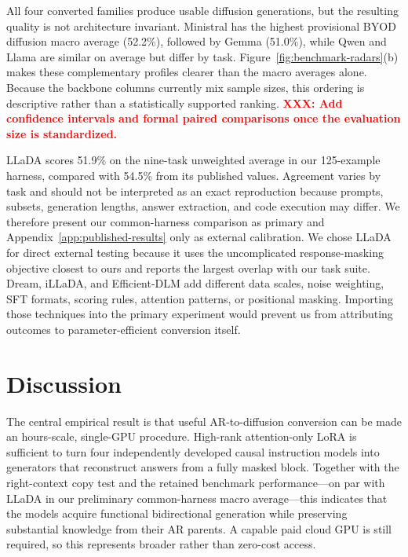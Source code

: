 \documentclass{article}
\newcommand{\xxx}[1]{\textcolor{red}{\textbf{XXX: #1}}}
\begin{document}
All four converted families produce usable diffusion generations, but the resulting quality is not architecture invariant. Ministral has the highest provisional BYOD diffusion macro average (52.2\%), followed by Gemma (51.0\%), while Qwen and Llama are similar on average but differ by task. Figure~\ref{fig:benchmark-radars}(b) makes these complementary profiles clearer than the macro averages alone. Because the backbone columns currently mix sample sizes, this ordering is descriptive rather than a statistically supported ranking. \xxx{Add confidence intervals and formal paired comparisons once the evaluation size is standardized.}

LLaDA scores 51.9\% on the nine-task unweighted average in our 125-example harness, compared with 54.5\% from its published values. Agreement varies by task and should not be interpreted as an exact reproduction because prompts, subsets, generation lengths, answer extraction, and code execution may differ. We therefore present our common-harness comparison as primary and Appendix~\ref{app:published-results} only as external calibration. We chose LLaDA for direct external testing because it uses the uncomplicated response-masking objective closest to ours and reports the largest overlap with our task suite. Dream, iLLaDA, and Efficient-DLM add different data scales, noise weighting, SFT formats, scoring rules, attention patterns, or positional masking. Importing those techniques into the primary experiment would prevent us from attributing outcomes to parameter-efficient conversion itself.

\section{Discussion}

The central empirical result is that useful AR-to-diffusion conversion can be made an hours-scale, single-GPU procedure. High-rank attention-only LoRA is sufficient to turn four independently developed causal instruction models into generators that reconstruct answers from a fully masked block. Together with the right-context copy test and the retained benchmark performance---on par with LLaDA in our preliminary common-harness macro average---this indicates that the models acquire functional bidirectional generation while preserving substantial knowledge from their AR parents. A capable paid cloud GPU is still required, so this represents broader rather than zero-cost access.
\end{document}
